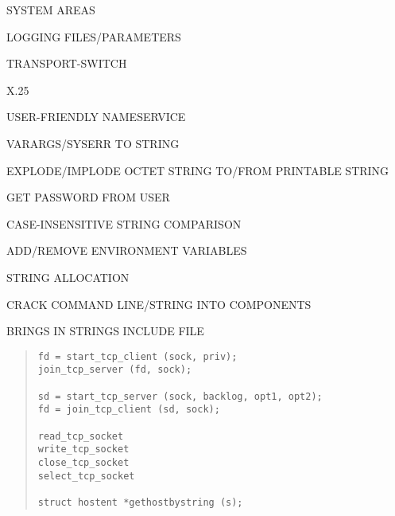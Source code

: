 \begin{bwslide}

\begin{nrtc}
\item	SYSTEM AREAS

\item	LOGGING FILES/PARAMETERS

\item	TRANSPORT-SWITCH

\item	X.25

\item	USER-FRIENDLY NAMESERVICE
\end{nrtc}
\end{bwslide}


\begin{bwslide}

\begin{nrtc}
\item	VARARGS/SYSERR TO STRING

\item	EXPLODE/IMPLODE OCTET STRING TO/FROM PRINTABLE STRING

\item	GET PASSWORD FROM USER

\item	CASE-INSENSITIVE STRING COMPARISON

\item	ADD/REMOVE ENVIRONMENT VARIABLES

\item	STRING ALLOCATION

\item	CRACK COMMAND LINE/STRING INTO COMPONENTS
\end{nrtc}
\end{bwslide}


\begin{bwslide}

\begin{nrtc}
\item	BRINGS IN STRINGS INCLUDE FILE
\end{nrtc}
\end{bwslide}


\begin{bwslide}

\begin{quote}\small\begin{verbatim}
fd = start_tcp_client (sock, priv);
join_tcp_server (fd, sock);

sd = start_tcp_server (sock, backlog, opt1, opt2);
fd = join_tcp_client (sd, sock);

read_tcp_socket
write_tcp_socket
close_tcp_socket
select_tcp_socket

struct hostent *gethostbystring (s);
\end{verbatim}\end{quote}
\end{bwslide}


